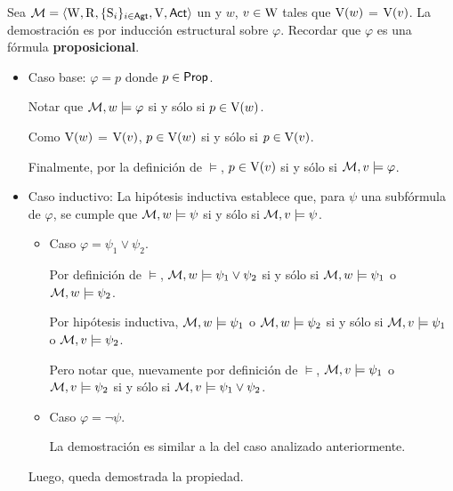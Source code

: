 \begin{demostracion}
    Sea $\mathcal{M}=\langle \mathrm{W},\mathrm{R},\{ \mathrm{S}_i \}_{i \in {\rm \sf Agt}},\mathrm{V},{\rm \sf Act} \rangle$ un \ults y $w$, $v \in \mathrm{W}$
    tales que $\mathrm{V}(w)$ = $\mathrm{V}(v)$. La demostración es por inducción estructural sobre $\varphi$. 
    Recordar que $\varphi$ es una fórmula \textbf{proposicional}.

    \begin{itemize}
        \item Caso base: $\varphi = p$ donde $p \in {\rm \sf Prop}$.

        Notar que  $\mathcal{M}, w \models \varphi$ si y sólo si $p \in \mathrm{V}(w)$.

        Como $\mathrm{V}(w)$ = $\mathrm{V}(v)$, $p \in \mathrm{V}(w)$ si y sólo si $p \in \mathrm{V}(v)$.

        Finalmente, por la definición de $\models$, $p \in \mathrm{V}(v)$ si y sólo si $\mathcal{M}, v \models \varphi$.  
    
        \item Caso inductivo: La hipótesis inductiva establece que, para $\psi$ una subfórmula de $\varphi$, 
        se cumple que $\mathcal{M}, w \models \psi$ si y sólo si $\mathcal{M}, v \models \psi$.

        \begin{itemize}
            \item Caso $\varphi = \psi_1 \lor \psi_2$. 
    
            Por definición de $\models$, $\mathcal{M}, w \models \psi_1 \lor \psi_2$ si y sólo si $\mathcal{M},
            w \models \psi_1$ o $\mathcal{M}, w \models \psi_2$.
            
            Por hipótesis inductiva, $\mathcal{M}, w \models \psi_1$ o $\mathcal{M}, w \models \psi_2 $ si y sólo
            si $\mathcal{M}, v \models \psi_1$ o $\mathcal{M}, v \models \psi_2$. 
            
            Pero notar que, nuevamente por definición de $\models$, $\mathcal{M}, v \models \psi_1$ o $\mathcal{M},
            v \models \psi_2$ si y sólo si $\mathcal{M},v \models \psi_1 \lor \psi_2$.  

            \item Caso $\varphi = \neg \psi$.
        
            La demostración es similar a la del caso analizado anteriormente.
        \end{itemize}
        Luego, queda demostrada la propiedad.
    \end{itemize}
    
\end{demostracion}


